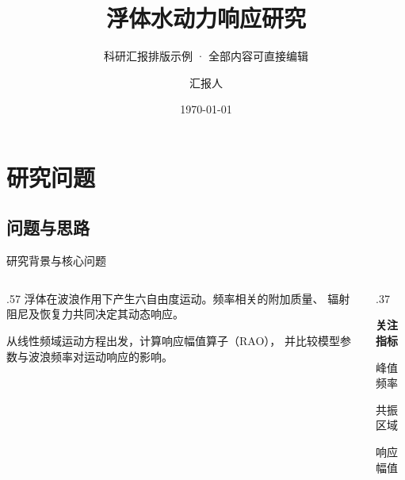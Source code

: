 \documentclass[UTF8,aspectratio=169]{beamer}
\title[浮体水动力响应]{浮体水动力响应研究}
\subtitle{科研汇报排版示例 · 全部内容可直接编辑}
\author{汇报人}
\institute{单位名称}
\date{\today}
\begin{document}

\section{研究问题}
\subsection{问题与思路}

\begin{frame}[t]{研究背景与核心问题}

  \begin{columns}[T,onlytextwidth]
    \begin{column}{.57\textwidth}
      浮体在波浪作用下产生六自由度运动。频率相关的附加质量、
      辐射阻尼及恢复力共同决定其动态响应。

      \medskip
      从线性频域运动方程出发，计算响应幅值算子（RAO），
      并比较模型参数与波浪频率对运动响应的影响。
    \end{column}
    \begin{column}{.37\textwidth}
      \begin{ResearchNote}
        \textcolor{PrimaryC}{\bfseries 关注指标}\par\smallskip
        峰值频率\par\smallskip
        共振区域\par\smallskip
        响应幅值
      \end{ResearchNote}
    \end{column}
  \end{columns}
\end{frame}
\end{document}

